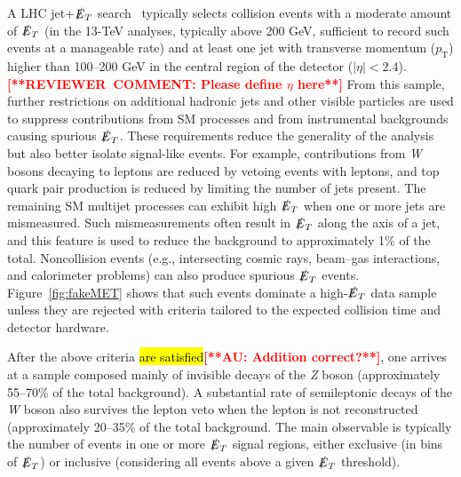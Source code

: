 \documentclass{ar-1col}
\newcommand{\pt}{\ensuremath{p_\mathrm{T}}\xspace}
\newcommand{\MET}{\ensuremath{\slashed{E}_T}\xspace}
\begin{document}
A LHC jet+\MET search~\cite{Aaboud:2017phn,Sirunyan:2017jix}
typically selects collision events with a moderate amount of \MET
(in the 13-TeV analyses, typically above 200 GeV, sufficient to
record such events at a manageable rate) and at least one jet with
transverse momentum (\pt) higher than 100--200 GeV in the central
region of the detector ($|\eta|<2.4$).\textbf{\textcolor{red}{[**REVIEWER\ COMMENT: Please define $\eta$ here**]}} From this sample, further
restrictions on additional hadronic jets and other visible
particles are used to suppress contributions from SM processes and
from instrumental backgrounds causing spurious \MET. These
requirements reduce the generality of the analysis but also better
isolate signal-like events. For example, contributions from \textit{W}
bosons decaying to leptons are reduced by vetoing events with
leptons, and top quark pair production is reduced by limiting the number
of jets present. The remaining SM multijet processes can exhibit
high \MET when one or more jets are mismeasured. Such
mismeasurements often result in \MET along the axis of a jet, and
this feature is used to reduce the background to approximately 1\% of the
total. Noncollision events (e.g., intersecting cosmic rays,
beam--gas interactions, and calorimeter problems) can also produce
spurious \MET events. Figure~\ref{fig:fakeMET} shows that such
events dominate a high-\MET data sample unless they are rejected with
criteria tailored to the expected collision time and detector
hardware.

After the above criteria \hl{are satisfied}\textbf{\textcolor{red}{[**AU: Addition correct?**]}}, one arrives at a sample composed mainly
of invisible decays of the \textit{Z} boson (approximately 55--70\% of the
total background). A substantial rate of semileptonic decays of
the \textit{W} boson also survives the lepton veto when the lepton is not
reconstructed (approximately 20--35\% of the total background.
The main observable is typically the number of events in one or
more \MET signal regions, either exclusive (in bins of
\MET) or inclusive (considering all events above a given \MET
threshold).

\begin{marginnote}[]
\end{marginnote}
\end{document}
